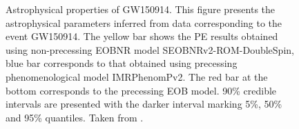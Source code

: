 \begin{figure}
\caption{Astrophysical properties of GW150914. This figure presents the astrophysical parameters inferred from data corresponding to the event GW150914. The yellow bar shows the PE results obtained using non-precessing EOBNR model SEOBNRv2-ROM-DoubleSpin, blue bar corresponds to that obtained using precessing phenomenological model IMRPhenomPv2. The red bar at the bottom corresponds to the precessing EOB model. 90\% credible intervals are presented with the darker interval marking 5\%, 50\% and 95\% quantiles. Taken from \cite{gw150914PEseobnrv3}.} 
\label{fig:GW150914-PE-plot}
\end{figure}



